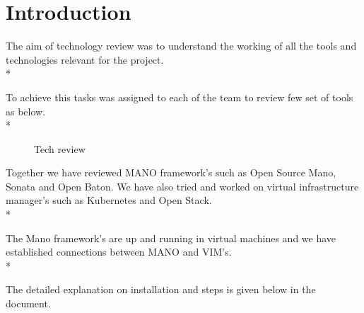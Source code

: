 \chapter{Introduction}
\label{ch:Introduction}

The aim of technology review was to understand the working of all the tools and technologies relevant for the project.\\*

To achieve this tasks was assigned to each of the team to review few set of tools as below. \\*

	\begin{figure} [h]
	\centering
	\caption{Tech review}
\end{figure}

Together we have reviewed MANO framework's such as Open Source Mano, Sonata and Open Baton. We have also tried and worked on virtual infrastructure manager's such as Kubernetes and Open Stack.\\*

The Mano framework's are up and running in virtual machines and we have established connections between MANO and VIM's.\\*

The detailed explanation on installation and steps is given below in the document.



